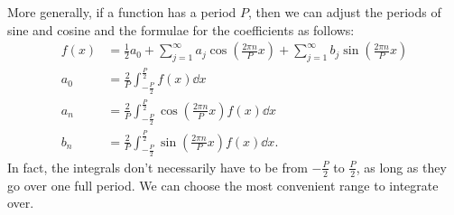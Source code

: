 \documentclass[../classical_mechanics.tex]{subfiles}
\begin{document}
        More generally, if a function has a period $P$, then we can adjust the periods of sine and cosine and the formulae for the coefficients as follows:
        \begin{align}
            f(x)&=\frac{1}{2}a_0+\sum_{j=1}^\infty a_j\cos\left(\frac{2\pi n}{P}x\right)+\sum_{j=1}^\infty b_j\sin\left(\frac{2\pi n}{P}x\right)\\
            a_0&=\frac{2}{P}\int_{-\frac{P}{2}}^{\frac{P}{2}}f(x)\dd{x}\\
            a_n&=\frac{2}{P}\int_{-\frac{P}{2}}^{\frac{P}{2}}\cos\left(\frac{2\pi n}{P}x\right)f(x)\dd{x}\\
            b_n&=\frac{2}{P}\int_{-\frac{P}{2}}^{\frac{P}{2}}\sin\left(\frac{2\pi n}{P}x\right)f(x)\dd{x}.
        \end{align}
        In fact, the integrals don't necessarily have to be from $-\frac{P}{2}$ to $\frac{P}{2}$, as long as they go over one full period.
        We can choose the most convenient range to integrate over.
\end{document}
